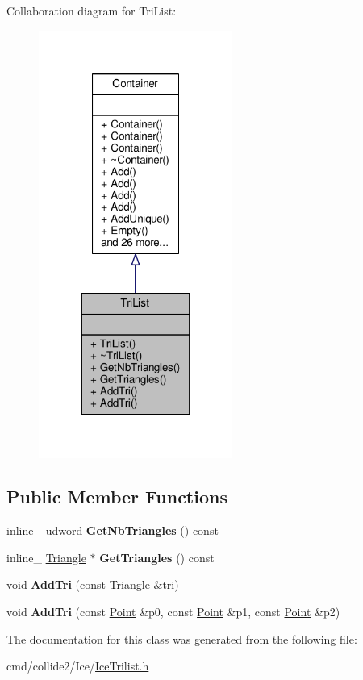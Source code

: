 Collaboration diagram for Tri\+List\+:
\nopagebreak
\begin{figure}[H]
\begin{center}
\leavevmode
\includegraphics[width=180pt]{d6/dc6/classTriList__coll__graph}
\end{center}
\end{figure}
\subsection*{Public Member Functions}
\begin{DoxyCompactItemize}
\item 
inline\+\_\+ \hyperlink{IceTypes_8h_a44c6f1920ba5551225fb534f9d1a1733}{udword} {\bfseries Get\+Nb\+Triangles} () const \hypertarget{classTriList_abbe08fb21cdebad9bc594581176756d6}{}\label{classTriList_abbe08fb21cdebad9bc594581176756d6}

\item 
inline\+\_\+ \hyperlink{classTriangle}{Triangle} $\ast$ {\bfseries Get\+Triangles} () const \hypertarget{classTriList_a081841ad5d6a23ee0162ee8a7dc4393f}{}\label{classTriList_a081841ad5d6a23ee0162ee8a7dc4393f}

\item 
void {\bfseries Add\+Tri} (const \hyperlink{classTriangle}{Triangle} \&tri)\hypertarget{classTriList_a0323e059707289050c4ca9a99f8f301d}{}\label{classTriList_a0323e059707289050c4ca9a99f8f301d}

\item 
void {\bfseries Add\+Tri} (const \hyperlink{classPoint}{Point} \&p0, const \hyperlink{classPoint}{Point} \&p1, const \hyperlink{classPoint}{Point} \&p2)\hypertarget{classTriList_a269d49dc0f9e52e9e144230a13aa5412}{}\label{classTriList_a269d49dc0f9e52e9e144230a13aa5412}

\end{DoxyCompactItemize}


The documentation for this class was generated from the following file\+:\begin{DoxyCompactItemize}
\item 
cmd/collide2/\+Ice/\hyperlink{IceTrilist_8h}{Ice\+Trilist.\+h}\end{DoxyCompactItemize}
